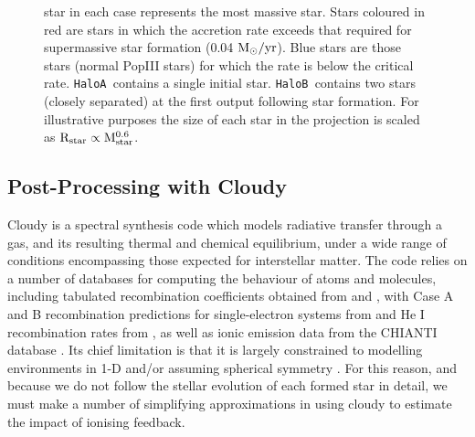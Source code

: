 \documentclass[graphics, twocolumn, usenatbib]{mn2e}
\newcommand{\msolaryrc} {$\rm{M_{\odot}/yr}$}
\newcommand{\ha} {\texttt{HaloA~}}
\newcommand{\hb} {\texttt{HaloB~}}
\begin{document}
\begin{figure}
\begin{minipage}{175mm}
\begin{center}
{  star in each case represents the most massive star. Stars coloured in red are stars in which the accretion rate
  exceeds that required for supermassive star formation (0.04 \msolaryrc). Blue stars are those stars
  (normal PopIII stars) for
  which the rate is below the critical rate. \ha contains a single initial star. \hb contains two stars (closely separated)
  at the first output following star formation. For illustrative purposes the size of each star in the
projection is scaled as $\rm{R_{star}} \propto \rm{M_{star}^{0.6}}$.}\label{Fig:ProjectionStart}
\end{center} \end{minipage}

\end{figure}

\subsection{Post-Processing with Cloudy}
\label{cloudy:description}
{\sc Cloudy} \citep{Ferland_2017} is a spectral synthesis code which models radiative transfer through a gas, and its resulting thermal and chemical equilibrium, under a wide range of conditions encompassing those expected for interstellar matter. %
The code relies on a number of databases for computing the behaviour of atoms and molecules, including tabulated recombination coefficients obtained from \cite{Badnell_2003} and \cite{Badnell_2006}, with Case A and B recombination predictions for single-electron systems from \cite{Storey_1995} and He I recombination rates from \cite{Porter_2012}, as well as ionic emission data from the CHIANTI database \citep{Dere_1997,Dere_2012}. Its chief limitation is that it is largely constrained to modelling environments in 1-D and/or assuming spherical symmetry \citep[though see, e.g.,][for recent efforts to extend its implementation to pseudo-3-D problems]{Morisset_2013, Fitzgerald_2020}. For this reason, and because we do not follow the stellar evolution of each formed star in detail, we must make a number of simplifying approximations in using {\sc cloudy} to estimate the impact of ionising feedback. 
\end{document}
